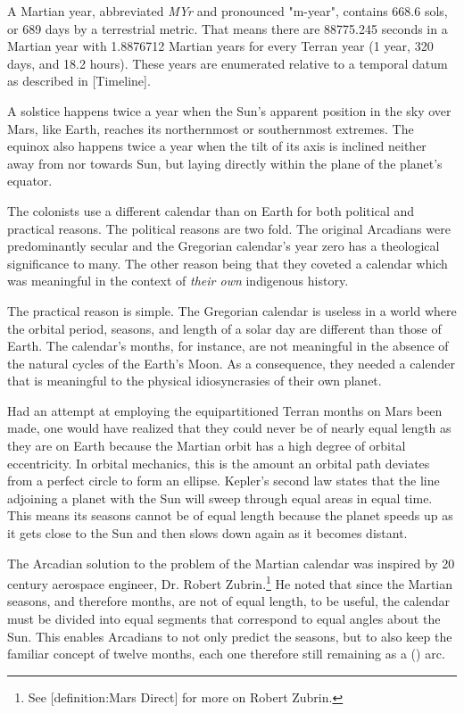 A Martian year, abbreviated {\it MYr} and pronounced "m-year", contains 668.6 sols, or 689 days by a terrestrial metric. That means there are 88775.245 seconds in a Martian year with 1.8876712 Martian years for every Terran year (1 year, 320 days, and 18.2 hours). These years are enumerated relative to a temporal datum as described in [Timeline].


A solstice happens twice a year when the Sun's apparent position in the sky over Mars, like Earth, reaches its northernmost or southernmost extremes. The equinox also happens twice a year when the tilt of its axis is inclined neither away from nor towards Sun, but laying directly within the plane of the planet's equator.


The colonists use a different calendar than on Earth for both political and practical reasons. The political reasons are two fold. The original Arcadians were predominantly secular and the Gregorian calendar's year zero has a theological significance to many. The other reason being that they coveted a calendar which was meaningful in the context of {\it their own} indigenous history.

The practical reason is simple. The Gregorian calendar is useless in a world where the orbital period, seasons, and length of a solar day are different than those of Earth. The calendar's months, for instance, are not meaningful in the absence of the natural cycles of the Earth's Moon. As a consequence, they needed a calender that is meaningful to the physical idiosyncrasies of their own planet.

Had an attempt at employing the equipartitioned Terran months on Mars been made, one would have realized that they could never be of nearly equal length as they are on Earth because the Martian orbit has a high degree of orbital eccentricity. In orbital mechanics, this is the amount an orbital path deviates from a perfect circle to form an ellipse. Kepler's second law states that the line adjoining a planet with the Sun will sweep through equal areas in equal time. This means its seasons cannot be of equal length because the planet speeds up as it gets close to the Sun and then slows down again as it becomes distant.

The Arcadian solution to the problem of the Martian calendar was inspired by 20 century aerospace engineer, Dr. Robert Zubrin.\footnote{See [definition:Mars Direct] for more on Robert Zubrin.} He noted that since the Martian seasons, and therefore months, are not of equal length, to be useful, the calendar must be divided into equal segments that correspond to equal angles about the Sun. This enables Arcadians to not only predict the seasons, but to also keep the familiar concept of twelve months, each one therefore still remaining as a  () arc. 

